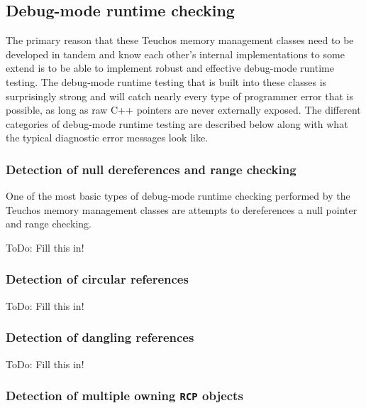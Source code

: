 \documentclass[pdf,ps2pdf,11pt]{SANDreport}
\begin{document}
%
{}\subsection{Debug-mode runtime checking}
\label{sec:debug-mode-runtime-checking}
%

The primary reason that these Teuchos memory management classes need
to be developed in tandem and know each other's internal
implementations to some extend is to be able to implement robust and
effective debug-mode runtime testing.  The debug-mode runtime testing
that is built into these classes is surprisingly strong and will catch
nearly every type of programmer error that is possible, as long as raw
C++ pointers are never externally exposed.  The different categories
of debug-mode runtime testing are described below along with what the
typical diagnostic error messages look like.


%
{}\subsubsection{Detection of null dereferences and range checking}
\label{sec:null-dereferences-range-checking}
%

One of the most basic types of debug-mode runtime checking performed
by the Teuchos memory management classes are attempts to dereferences
a null pointer and range checking.

ToDo: Fill this in!


%
{}\subsubsection{Detection of circular references}
\label{sec:detection-circular-references}
%

ToDo: Fill this in!


%
{}\subsubsection{Detection of dangling references}
\label{sec:detection-dangling-references}
%

ToDo: Fill this in!


%
{}\subsubsection{Detection of multiple owning {}\texttt{RCP} objects}
\label{sec:detection-dual-owning-rcps}
%
\end{document}
